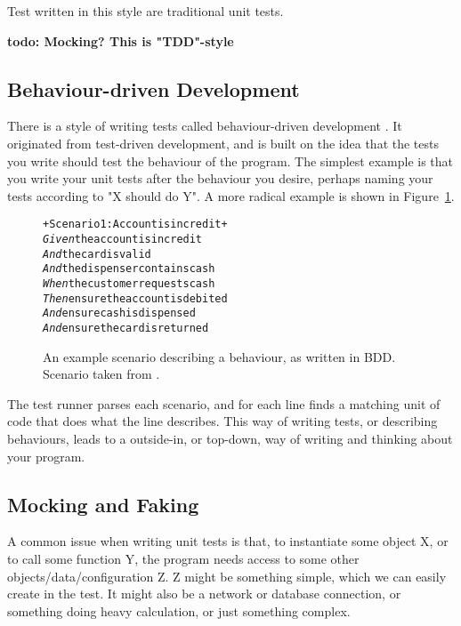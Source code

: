 \documentclass[a4paper,11pt]{kth-mag}
\newcommand{\todo}[1]{\textbf{todo: #1}}
\begin{document}
Test written in this style are traditional unit tests. 

\todo{Mocking? This is "TDD"-style}

\subsection{Behaviour-driven Development}

There is a style of writing tests called behaviour-driven development
\cite{north06bdd}. It originated from test-driven development, and is built on
the idea that the tests you write should test the behaviour of the program. The
simplest example is that you write your unit tests after the behaviour you
desire, perhaps naming your tests according to "X should do Y". A more radical
example is shown in Figure~\ref{figure-bdd}.

\begin{figure}[h!]

\begin{alltt}
+Scenario 1: Account is in credit+
\textit{Given} the account is in credit
\textit{And} the card is valid
\textit{And} the dispenser contains cash
\textit{When} the customer requests cash
\textit{Then} ensure the account is debited
\textit{And} ensure cash is dispensed
\textit{And} ensure the card is returned
\end{alltt}

\caption{An example scenario describing a behaviour, as written in BDD.
Scenario taken from \cite{north06bdd}.}
\label{figure-bdd}
\end{figure}

The test runner parses each scenario, and for each line finds a matching unit
of code that does what the line describes. This way of writing tests, or
describing behaviours, leads to a outside-in, or top-down, way of writing and
thinking about your program.

\subsection{Mocking and Faking}

A common issue when writing unit tests is that, to instantiate some object X,
or to call some function Y, the program needs access to some other
objects/data/configuration Z. Z might be something simple, which we can easily
create in the test. It might also be a network or database connection, or
something doing heavy calculation, or just something complex.
\end{document}
